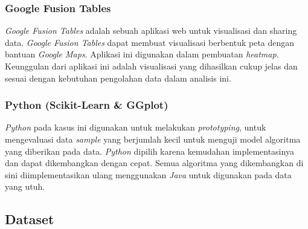 \documentclass{article}
\begin{document}
\subsubsection{Google Fusion Tables}
\begin{adjustwidth}{4em}{0pt}
	
\hspace{\parindent}\textit{Google Fusion Tables} adalah sebuah aplikasi web untuk visualisasi dan sharing data. \textit{Google Fusion Tables} dapat membuat visualisasi berbentuk peta dengan bantuan \textit{Google Maps}. Aplikasi ini digunakan dalam pembuatan \textit{heatmap}. Keunggulan dari aplikasi ini adalah visualisasi yang dihasilkan cukup jelas dan sesuai dengan kebutuhan pengolahan data dalam analisis ini.

\end{adjustwidth}
\subsubsection{Python (Scikit-Learn \& GGplot)}
\begin{adjustwidth}{4em}{0pt}
		
\hspace{\parindent}\textit{Python} pada kasus ini digunakan untuk melakukan \textit{prototyping}, untuk mengevaluasi data \textit{sample} yang berjumlah kecil untuk menguji model algoritma yang diberikan pada data. \textit{Python} dipilih karena kemudahan implementasinya dan dapat dikembangkan dengan cepat. Semua algoritma yang dikembangkan di sini diimplementasikan ulang menggunakan \textit{Java} untuk digunakan pada data yang utuh.

\end{adjustwidth}

\subsection{Dataset}
\end{document}
